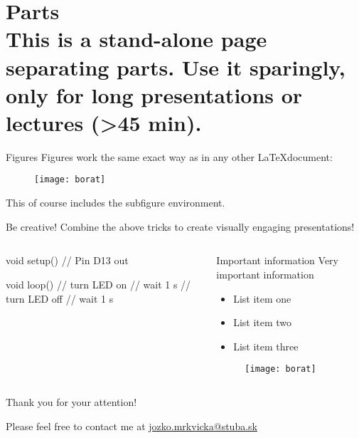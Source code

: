 \documentclass{beamer}
\begin{document}
\part{{\bf Parts} \protect\\ This is a stand-alone page separating parts. Use it sparingly, only for long presentations or lectures (>45 min).}
\frame{\partpage}

\begin{frame}{Figures}
Figures work the same exact way as in any other \LaTeX document:
\begin{figure}
\centering
  \texttt{[image: borat]}\\
\end{figure}
This of course includes the subfigure environment.
\end{frame}




\begin{frame}[fragile]{Be creative!}
Combine the above tricks to create visually engaging presentations!
\begin{columns}[T] %
\begin{column}{.48\textwidth}
\begin{ardu}
void setup() {
     // Pin D13 out
}

void loop() {
     // turn LED on
     // wait 1 s
     // turn LED off
     // wait 1 s
}
\end{ardu}
\end{column}
\begin{column}{.48\textwidth}
\begin{block}{Important information}
Very important information
\end{block}
\begin{itemize}
\item List item one
\item List item two
\item List item three
\end{itemize}
\begin{figure}
\centering
  \texttt{[image: borat]}\\
\end{figure}
\end{column}%
\end{columns}
\end{frame}

\begin{frame}
\vspace{8em}
{\Huge Thank you for your attention!}

\vspace{8em}
Please feel free to contact me at
\url{jozko.mrkvicka@stuba.sk}
\end{frame}
\end{document}
